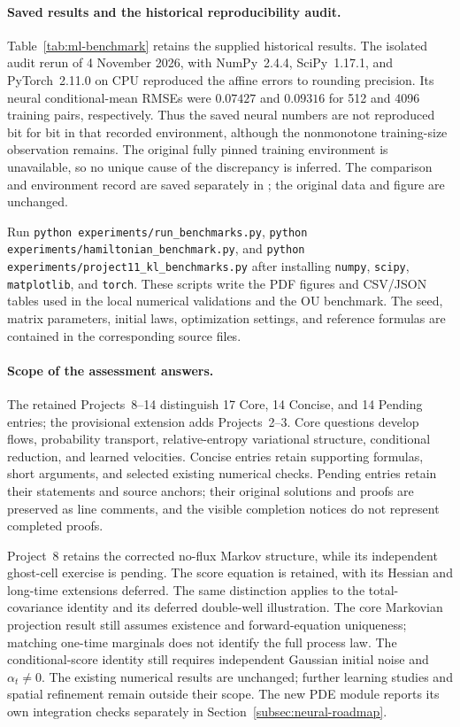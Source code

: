 \documentclass[12pt,a4paper,oneside]{book}
\begin{document}
\paragraph{Saved results and the historical reproducibility audit.}
Table~\ref{tab:ml-benchmark} retains the supplied historical results.
The isolated audit rerun of 4 November 2026, with NumPy~2.4.4, SciPy~1.17.1, and
PyTorch~2.11.0 on CPU reproduced the affine errors to rounding precision.
Its neural conditional-mean RMSEs were $0.07427$ and $0.09316$ for
512 and 4096 training pairs, respectively. Thus the saved neural numbers
are not reproduced bit for bit in that recorded environment, although the
nonmonotone training-size observation remains. The original fully pinned
training environment is unavailable, so no unique cause of the discrepancy
is inferred. The comparison and environment record are saved separately
in ; the original data and figure are
unchanged.

\begin{Notice}
\raggedright
Run \texttt{python experiments/run\_benchmarks.py},
\texttt{python experiments/hamiltonian\_benchmark.py}, and
\texttt{python experiments/project11\_kl\_benchmarks.py} after installing
\texttt{numpy}, \texttt{scipy}, \texttt{matplotlib}, and \texttt{torch}.
These scripts write the PDF figures and CSV/JSON tables used in the local
numerical validations and the OU benchmark.
The seed, matrix parameters, initial laws, optimization settings, and
reference formulas are contained in the corresponding source files.
\end{Notice}

\paragraph{Scope of the assessment answers.}
The retained Projects~8--14 distinguish 17 Core, 14 Concise, and 14 Pending entries; the provisional extension adds Projects~2--3. Core questions develop flows,
probability transport, relative-entropy variational structure, conditional reduction, and learned velocities.
Concise entries retain supporting formulas, short arguments, and selected existing numerical checks.
Pending entries retain their statements and source anchors; their original solutions and proofs are preserved
as line comments, and the visible completion notices do not represent completed proofs.

Project~8 retains the corrected no-flux Markov structure, while its independent ghost-cell exercise is pending.
The score equation is retained, with its Hessian and long-time extensions deferred. The same distinction applies
to the total-covariance identity and its deferred double-well illustration. The core Markovian projection result
still assumes existence and forward-equation uniqueness; matching one-time marginals does not identify the full process law.
The conditional-score identity still requires independent Gaussian initial noise and $\alpha_t\ne0$.
The existing numerical results are unchanged; further learning studies and spatial refinement remain outside their scope. The new PDE module reports its own integration checks separately in Section~\ref{subsec:neural-roadmap}.
\end{document}

